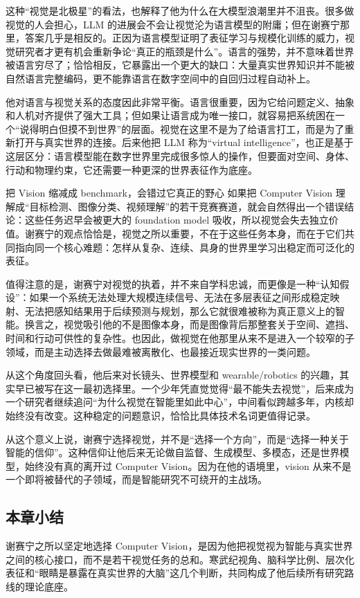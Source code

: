 这种“视觉是北极星”的看法，也解释了他为什么在大模型浪潮里并不沮丧。很多做视觉的人会担心，LLM 的进展会不会让视觉沦为语言模型的附庸；但在谢赛宁那里，答案几乎是相反的。正因为语言模型证明了表征学习与规模化训练的威力，视觉研究者才更有机会重新争论“真正的瓶颈是什么”。语言的强势，并不意味着世界被语言穷尽了；恰恰相反，它暴露出一个更大的缺口：大量真实世界知识并不能被自然语言完整编码，更不能靠语言在数字空间中的自回归过程自动补上。

他对语言与视觉关系的态度因此非常平衡。语言很重要，因为它给问题定义、抽象和人机对齐提供了强大工具；但如果让语言成为唯一接口，就容易把系统困在一个“说得明白但摸不到世界”的层面。视觉在这里不是为了给语言打工，而是为了重新打开与真实世界的连接。后来他把 LLM 称为“virtual intelligence”，也正是基于这层区分：语言模型能在数字世界里完成很多惊人的操作，但要面对空间、身体、行动和物理约束，它还需要一种更深的世界表征作为底座。

\begin{warningbox}{把 Vision 缩减成 benchmark，会错过它真正的野心}
如果把 Computer Vision 理解成“目标检测、图像分类、视频理解”的若干竞赛赛道，就会自然得出一个错误结论：这些任务迟早会被更大的 foundation model 吸收，所以视觉会失去独立价值。谢赛宁的观点恰恰是，视觉之所以重要，不在于这些任务本身，而在于它们共同指向同一个核心难题：怎样从复杂、连续、具身的世界里学习出稳定而可泛化的表征。
\end{warningbox}

值得注意的是，谢赛宁对视觉的执着，并不来自学科忠诚，而更像是一种“认知假设”：如果一个系统无法处理大规模连续信号、无法在多层表征之间形成稳定映射、无法把感知结果用于后续预测与规划，那么它就很难被称为真正意义上的智能。换言之，视觉吸引他的不是图像本身，而是图像背后那整套关于空间、遮挡、时间和行动可供性的复杂性。也因此，做视觉在他那里从来不是进入一个较窄的子领域，而是主动选择去做最难被离散化、也最接近现实世界的一类问题。

从这个角度回头看，他后来对长镜头、世界模型和 wearable/robotics 的兴趣，其实早已被写在这一最初选择里。一个少年凭直觉觉得“最不能失去视觉”，后来成为一个研究者继续追问“为什么视觉在智能里如此中心”，中间看似跨越多年，内核却始终没有改变。这种稳定的问题意识，恰恰比具体技术名词更值得记录。

从这个意义上说，谢赛宁选择视觉，并不是“选择一个方向”，而是“选择一种关于智能的信仰”。这种信仰让他后来无论做自监督、生成模型、多模态，还是世界模型，始终没有真的离开过 Computer Vision。因为在他的语境里，vision 从来不是一个即将被替代的子领域，而是智能研究不可绕开的主战场。

\subsection{本章小结}

谢赛宁之所以坚定地选择 Computer Vision，是因为他把视觉视为智能与真实世界之间的核心接口，而不是若干视觉任务的总和。寒武纪视角、脑科学比例、层次化表征和“眼睛是暴露在真实世界的大脑”这几个判断，共同构成了他后续所有研究路线的理论底座。

